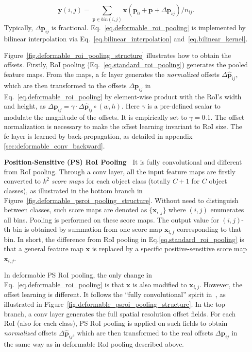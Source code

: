 \documentclass[10pt,twocolumn,letterpaper]{article}
\begin{document}
\begin{equation}
\mathbf{y}(i,j)=\sum_{\mathbf{p}\in bin(i,j)} \mathbf{x}(\mathbf{p}_0+\mathbf{p}+\Delta \mathbf{p}_{ij})/n_{ij}.
\label{eq.deformable_roi_pooling}
\end{equation}
Typically, $\Delta \mathbf{p}_{ij}$ is fractional. Eq.~\eqref{eq.deformable_roi_pooling} is implemented by bilinear interpolation via Eq.~\eqref{eq.bilinear_interpolation} and~\eqref{eq.bilinear_kernel}.

Figure~\ref{fig.deformable_roi_pooling_structure} illustrates how to obtain the offsets. Firstly, RoI pooling (Eq.~\eqref{eq.standard_roi_pooling}) generates the pooled feature maps. From the maps, a fc layer generates the \emph{normalized} offsets $\Delta \widehat{\mathbf{p}}_{ij}$, which are then transformed to the offsets $\Delta \mathbf{p}_{ij}$ in Eq.~\eqref{eq.deformable_roi_pooling} by element-wise product with the RoI's width and height, as $\Delta \mathbf{p}_{ij} = \gamma \cdot \Delta \widehat{\mathbf{p}}_{ij} \circ (w, h)$. Here $\gamma$ is a pre-defined scalar to modulate the magnitude of the offsets. It is empirically set to $\gamma=0.1$. The offset normalization is necessary to make the offset learning invariant to RoI size. The fc layer is learned by back-propagation, as detailed in appendix \ref{sec:deformable_conv_backward}.

\textbf{Position-Sensitive (PS) RoI Pooling~\cite{dai2016rfcn}} It is fully convolutional and different from RoI pooling. Through a conv layer, all the input feature maps are firstly converted to $k^2$ \emph{score maps} for each object class (totally $C+1$ for $C$ object classes), as illustrated in the bottom branch in Figure~\ref{fig.deformable_psroi_pooling_structure}. Without need to distinguish between classes, such score maps are denoted as $\{\mathbf{x}_{i,j}\}$ where $(i,j)$ enumerates all bins. Pooling is performed on these score maps. The output value for $(i,j)$-th bin is obtained by summation from one score map $\mathbf{x}_{i,j}$ corresponding to that bin. In short, the difference from RoI pooling in Eq.\eqref{eq.standard_roi_pooling} is that a general feature map $\mathbf{x}$ is replaced by a specific positive-sensitive score map $\mathbf{x}_{i,j}$. 

In deformable PS RoI pooling, the only change in Eq.~\eqref{eq.deformable_roi_pooling} is that $\mathbf{x}$ is also modified to $\mathbf{x}_{i,j}$. However, the offset learning is different. It follows the ``fully convolutional'' spirit in~\cite{dai2016rfcn}, as illustrated in Figure~\ref{fig.deformable_psroi_pooling_structure}. In the top branch, a conv layer generates the full spatial resolution offset fields. For each RoI (also for each class), PS RoI pooling is applied on such fields to obtain \emph{normalized} offsets $\Delta \widehat{\mathbf{p}}_{ij}$, which are then transformed to the real offsets $\Delta \mathbf{p}_{ij}$ in the same way as in deformable RoI pooling described above.
\end{document}
